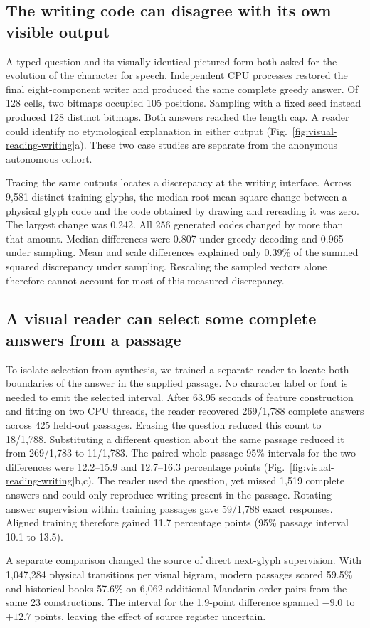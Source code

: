 \subsection*{The writing code can disagree with its own visible output}
A typed question and its visually identical pictured form both asked for
the evolution of the character for speech. Independent CPU processes restored
the final eight-component writer and produced the same complete greedy answer.
Of 128 cells, two bitmaps occupied 105 positions. Sampling with a fixed seed
instead produced 128 distinct bitmaps. Both answers reached the length cap.
A reader could identify no etymological explanation in either output
(Fig.~\ref{fig:visual-reading-writing}a). These two case studies are separate
from the anonymous autonomous cohort.

Tracing the same outputs locates a discrepancy at the writing interface.
Across 9,581 distinct training glyphs, the median root-mean-square change
between a physical glyph code and the code obtained by drawing and rereading
it was zero. The largest change was 0.242. All 256 generated codes changed by
more than that amount. Median differences were 0.807 under greedy decoding and
0.965 under sampling. Mean and scale differences explained only 0.39\% of
the summed squared discrepancy under sampling. Rescaling the sampled vectors
alone therefore cannot account for most of this measured discrepancy.

\subsection*{A visual reader can select some complete answers from a passage}
To isolate selection from synthesis, we trained a separate reader to locate
both boundaries of the answer in the supplied passage. No character label or
font is needed to emit the selected interval. After 63.95 seconds of feature
construction and fitting on two CPU threads, the reader recovered 269/1,788
complete answers across 425 held-out passages. Erasing the question reduced
this count to 18/1,788. Substituting a different question about the same
passage reduced it from 269/1,783 to 11/1,783. The paired whole-passage
95\% intervals for the two differences were 12.2--15.9 and 12.7--16.3
percentage points (Fig.~\ref{fig:visual-reading-writing}b,c).
The reader used the question, yet missed 1,519 complete answers and could
only reproduce writing present in the passage. Rotating answer supervision within
training passages gave 59/1,788 exact responses. Aligned training therefore
gained 11.7 percentage points (95\% passage interval 10.1 to 13.5).

A separate comparison changed the source of direct next-glyph supervision.
With 1,047,284 physical transitions per visual bigram, modern passages scored
59.5\% and historical books 57.6\% on 6,062 additional Mandarin order pairs
from the same 23 constructions. The interval for the 1.9-point difference
spanned $-9.0$ to $+12.7$ points, leaving the effect of source register uncertain.
